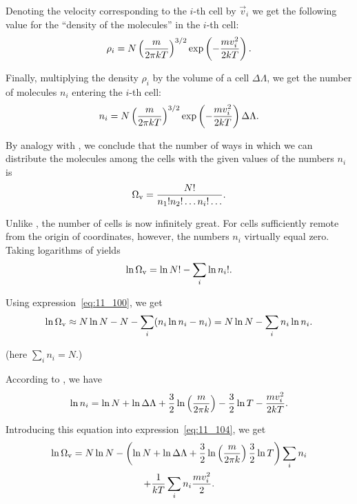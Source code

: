 \noindent
Denoting the velocity corresponding to the $i$-th cell by $\vec{v}_i$ we get the following value for the ``density of the molecules'' in the $i$-th cell:
\begin{equation*}
	\rho_i = N \left(\frac{m}{2\pi kT}\right)^{3/2} \exp\left(-\frac{mv_i^2}{2kT}\right).
\end{equation*}

\noindent
Finally, multiplying the density $\rho_i$ by the volume of a cell $\Delta\Lambda$, we get the number of molecules $n_i$ entering the $i$-th cell:
\begin{equation}\label{eq:11_102}
	n_i = N \left(\frac{m}{2\pi kT}\right)^{3/2} \exp\left(-\frac{mv_i^2}{2kT}\right) \Delta\Lambda.
\end{equation}

\noindent
By analogy with , we conclude that the number of ways in which we can distribute the molecules among the cells with the given values of the numbers $n_i$ is
\vspace{-12pt}
\begin{equation}\label{eq:11_103}
	\Omega_{\text{v}} = \frac{N!}{n_1! n_2! \ldots n_i! \ldots}.
\end{equation}

\noindent
Unlike , the number of cells is now infinitely great. For cells sufficiently remote from the origin of coordinates, however, the numbers $n_i$ virtually equal zero. Taking logarithms of  yields
\begin{equation*}
	\ln{\Omega_{\text{v}}} = \ln{N!} - \sum_i \ln{n_i!}.
\end{equation*}

\noindent
Using expression~\eqref{eq:11_100}, we get
\begin{equation}\label{eq:11_104}
	\ln{\Omega_{\text{v}}} \approx N\ln{N} - N - \sum_i (n_i \ln{n_i} - n_i) = N\ln{N} - \sum_i n_i\ln{n_i}.
\end{equation}

\noindent
(here $\sum_in_i=N$.)

According to , we have
\begin{equation*}
	\ln{n_i} = \ln{N} + \ln{\Delta\Lambda} + \frac{3}{2}\ln\left(\frac{m}{2\pi k}\right) - \frac{3}{2}\ln{T} - \frac{mv_i^2}{2kT}.
\end{equation*}

\noindent
Introducing this equation into expression~\eqref{eq:11_104}, we get
\begin{multline}
	\ln{\Omega_{\text{v}}} = N\ln{N} - \left(\ln{N} + \ln{\Delta\Lambda} + \frac{3}{2}\ln\left(\frac{m}{2\pi k}\right)	\frac{3}{2}\ln{T}\right) \sum_in_i\\
	+ \frac{1}{kT}\sum_i n_i \frac{mv_i^2}{2}.\label{eq:11_105}
\end{multline}

